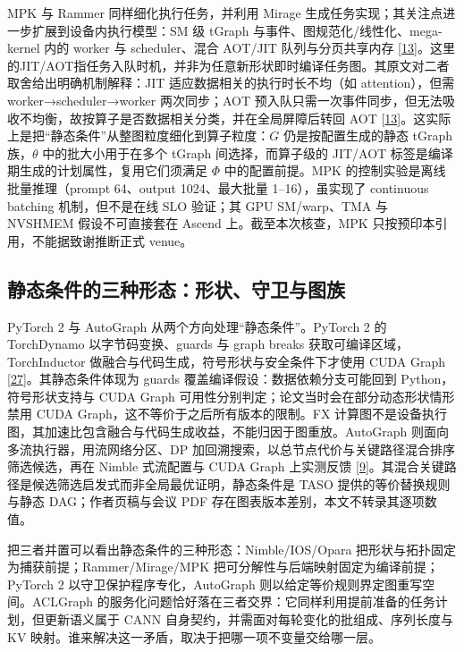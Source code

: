 \documentclass[
  UTF8,
  zihao=5]{ctexart}
\begin{document}
MPK 与 Rammer 同样细化执行任务，并利用 Mirage
生成任务实现；其关注点进一步扩展到设备内执行模型：SM 级 tGraph
与事件、图规范化/线性化、mega-kernel 内的 worker 与 scheduler、混合
AOT/JIT 队列与分页共享内存
{[}\protect\hyperlink{ref-cheng2026mpk}{13}{]}。这里的JIT/AOT指任务入队时机，并非为任意新形状即时编译任务图。其原文对二者取舍给出明确机制解释：JIT
适应数据相关的执行时长不均（如 attention），但需 worker→scheduler→worker
两次同步；AOT
预入队只需一次事件同步，但无法吸收不均衡，故按算子是否数据相关分类，并在全局屏障后转回
AOT
{[}\protect\hyperlink{ref-cheng2026mpk}{13}{]}。这实际上是把``静态条件''从整图粒度细化到算子粒度：\(G\)
仍是按配置生成的静态 tGraph 族，\(\theta\) 中的批大小用于在多个 tGraph
间选择，而算子级的 JIT/AOT 标签是编译期生成的计划属性，复用它们须满足
\(\Phi\) 中的配置前提。MPK 的控制实验是离线批量推理（prompt 64、output
1024、最大批量 1--16），虽实现了 continuous batching 机制，但不是在线
SLO 验证；其 GPU SM/warp、TMA 与 NVSHMEM 假设不可直接套在 Ascend
上。截至本次核查，MPK 只按预印本引用，不能据致谢推断正式 venue。

\hypertarget{ux9759ux6001ux6761ux4ef6ux7684ux4e09ux79cdux5f62ux6001ux5f62ux72b6ux5b88ux536bux4e0eux56feux65cf}{%
\subsection{静态条件的三种形态：形状、守卫与图族}\label{ux9759ux6001ux6761ux4ef6ux7684ux4e09ux79cdux5f62ux6001ux5f62ux72b6ux5b88ux536bux4e0eux56feux65cf}}

PyTorch 2 与 AutoGraph 从两个方向处理``静态条件''。PyTorch 2 的
TorchDynamo 以字节码变换、guards 与 graph breaks
获取可编译区域，TorchInductor
做融合与代码生成，符号形状与安全条件下才使用 CUDA Graph
{[}\protect\hyperlink{ref-ansel2024pytorch2}{27}{]}。其静态条件体现为
guards 覆盖编译假设：数据依赖分支可能回到 Python，符号形状支持与 CUDA
Graph 可用性分别判定；论文当时会在部分动态形状情形禁用 CUDA
Graph，这不等价于之后所有版本的限制。FX
计算图不是设备执行图，其加速比包含融合与代码生成收益，不能归因于图重放。AutoGraph
则面向多流执行器，用流网络分区、DP
加回溯搜索，以总节点代价与关键路径混合排序筛选候选，再在 Nimble
式流配置与 CUDA Graph 上实测反馈
{[}\protect\hyperlink{ref-zhao2023autograph}{9}{]}。其混合关键路径是候选筛选启发式而非全局最优证明，静态条件是
TASO 提供的等价替换规则与静态 DAG；作者页稿与会议 PDF
存在图表版本差别，本文不转录其逐项数值。

把三者并置可以看出静态条件的三种形态：Nimble/IOS/Opara
把形状与拓扑固定为捕获前提；Rammer/Mirage/MPK
把可分解性与后端映射固定为编译前提；PyTorch 2
以守卫保护程序专化，AutoGraph 则以给定等价规则界定图重写空间。ACLGraph
的服务化问题恰好落在三者交界：它同样利用提前准备的任务计划，但更新语义属于
CANN 自身契约，并需面对每轮变化的批组成、序列长度与 KV
映射。谁来解决这一矛盾，取决于把哪一项不变量交给哪一层。
\end{document}
